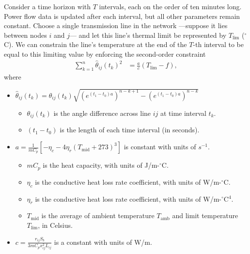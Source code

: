 \documentclass[conference]{IEEEtran}
\begin{document}
Consider a time horizon with $T$ intervals, each on the order of ten minutes long. Power flow data is updated after each interval, but all other parameters remain constant. Choose a single transmission line in the network ---suppose it lies between nodes $i$ and $j$--- and let this line's thermal limit be represented by $T_\text{lim}$ ($^\circ$C). We can constrain the line's temperature at the end of the $T$-th interval to be equal to this limiting value by enforcing the second-order constraint
\begin{align}\label{eq:tempconstraint}
\sum_{k=1}^n \hat{\theta}_{ij}(t_k)^2 &= \frac{a}{c}\left(T_\text{lim} - f\right),
\end{align}
where
\begin{itemize}
\itemsep1pt\parskip0pt
\item
  $\hat{\theta}_{ij}(t_{k})=  \theta_{ij}(t_k)\sqrt{ (e^{(t_1-t_0)a})^{n-k+1} - (e^{(t_1-t_0)a})^{n-k} } $

  \begin{itemize}
  \itemsep1pt\parskip0pt
  \item
    $\theta_{ij}(t_k)$ is the angle difference across line $ij$ at time
    interval $t_k$.
  \item
    $(t_1-t_0)$ is the length of each time interval (in seconds).
  \end{itemize}
\item
  $ a =
  \frac{1}{mC_p}\left[ -\eta_c - 4\eta_r(T_\text{mid} + 273)^3 \right]$
  is constant with units of $s^{-1}$.

  \begin{itemize}
  \itemsep1pt\parskip0pt
  \item
    $mC_p$ is the heat capacity, with units of J/m-$^\circ$C.
  \item
    $\eta_c$ is the conductive heat loss rate coefficient, with units of
    W/m-$^\circ$C.
  \item
    $\eta_r$ is the conductive heat loss rate coefficient, with units of
    W/m-$^\circ$C$^4$.
  \item
    $T_\text{mid}$ is the average of ambient temperature $T_\text{amb}$
    and limit temperature $T_\text{lim}$, in Celsius.
  \end{itemize}
\item
  $c = \frac{r_{ij}S_b}{3 mC_p x_{ij}^2L_{ij}}$ is a constant with units
  of W/m.


\end{itemize}
\end{document}
